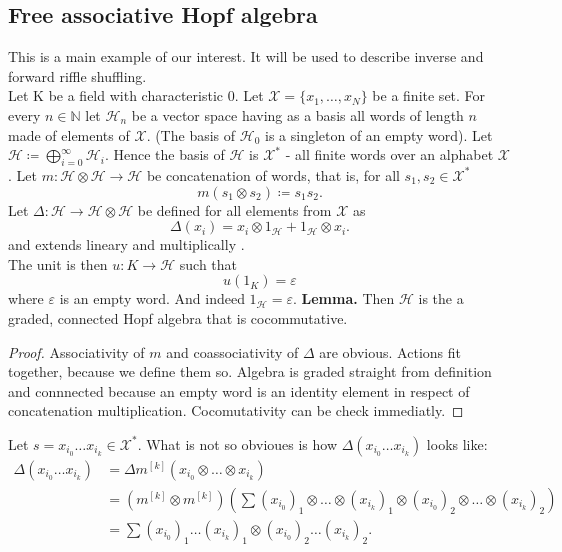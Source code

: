 \documentclass[a4paper, 12pt]{report}
\begin{document}
\subsection{Free associative Hopf algebra}
This is a main example of our interest. It will be used to describe inverse and forward riffle shuffling.\\
Let K be a field with characteristic 0.
Let $\mathcal{X} = \{x_1, \dots, x_N\}$ be a finite set. For every $n \in \mathbb{N}$ let
$\mathcal{H}_n$ be a vector space having as a basis all words of length $n$ made of elements
of $\mathcal{X}$. (The basis of $\mathcal{H}_0$ is a singleton of an empty word).
Let $\mathcal{H} \coloneqq \displaystyle\bigoplus^{\infty}_{i = 0} \mathcal{H}_i$. Hence
the basis of $\mathcal{H}$ is $\mathcal{X}^*$ - all finite words over an alphabet $\mathcal{X}$.
Let $m : \mathcal{H} \otimes \mathcal{H} \to \mathcal{H}$ be concatenation of words,
that is, for all $s_1, s_2 \in \mathcal{X}^*$
\begin{equation*}
m(s_1 \otimes s_2) \coloneqq s_1s_2.
\end{equation*}
Let $\Delta : \mathcal{H} \to \mathcal{H} \otimes \mathcal{H}$ be defined for all elements from
$\mathcal{X}$ as
\begin{equation*}
\Delta(x_i) = x_i \otimes 1_\mathcal{H} + 1_\mathcal{H} \otimes x_i.
\end{equation*}
and extends lineary and multiplically .\\
The unit is then $u : K \to \mathcal{H}$ such that
\begin{equation*}
u(1_K) = \varepsilon
\end{equation*}
where $\varepsilon$ is an empty word. And indeed $1_\mathcal{H} = \varepsilon$.
\textbf{Lemma. } Then $\mathcal{H}$ is the a graded, connected Hopf algebra that is cocommutative.
\begin{proof}
Associativity of $m$ and coassociativity of $\Delta$ are obvious. Actions fit together,
because we define them so. Algebra is graded straight from definition and connnected because an empty word
is an identity element in respect of concatenation multiplication. Cocomutativity can be check immediatly.
\end{proof}
\noindent Let $s = x_{i_0}\dots x_{i_k} \in \mathcal{X}^*$. What is not so obvioues is
how $\Delta(x_{i_0}\dots x_{i_k})$ looks like:
\begin{align}
\Delta(x_{i_0}\dots x_{i_k}) &= \Delta m^{[k]}(x_{i_0} \otimes \dots \otimes x_{i_k}) \\
&= (m^{[k]} \otimes m^{[k]}) \left(\sum (x_{i_0})_1 \otimes \dots \otimes (x_{i_k})_1 \otimes
(x_{i_0})_2 \otimes \dots \otimes (x_{i_k})_2\right) \\
&= \sum (x_{i_0})_1 \dots (x_{i_k})_1 \otimes
(x_{i_0})_2 \dots (x_{i_k})_2.
\end{align}
\end{document}
